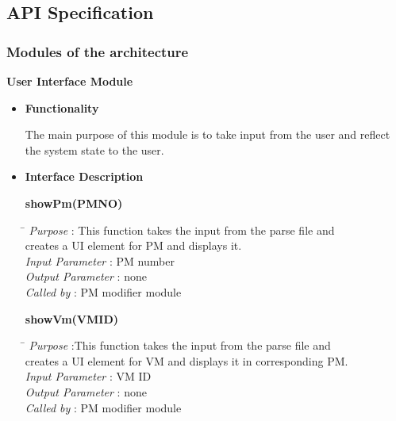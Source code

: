 \documentclass[a4paper,11pt]{article}
\begin{document}
\subsection{API Specification}
\subsubsection{Modules of the architecture }
\textbf{User Interface Module}
\begin{itemize}
 \item \textbf{Functionality}
 
 The main purpose of this module is to take input from the user and reflect the system state to the user. 
  \item \textbf{Interface Description} 
  
  \textbf{showPm(PM\textunderscore NO)}
  
  
\begin{tabbing}
\hspace*{4cm}\=  \kill
 \textit{Purpose} \> : This function takes the input from the parse file and \\ \>creates a UI element for PM and displays it.\\
  \textit{Input Parameter} \> : PM number \\
  \textit{Output Parameter} \> : none \\
  \textit{Called by} \> : PM modifier module 
  
\end{tabbing}

\textbf{showVm(VM\textunderscore ID)}
  
\begin{tabbing}
\hspace*{4cm}\=  \kill
 \textit{Purpose} \> :This function takes the input from the parse file and \\ \>creates a UI element for VM and displays it in corresponding PM.\\
  \textit{Input Parameter} \> : VM ID \\
  \textit{Output Parameter} \> : none \\
  \textit{Called by} \> : PM modifier module 
  

\end{tabbing}
\end{itemize}
\end{document}
